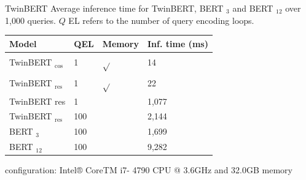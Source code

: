 \documentclass{beamer}
\begin{document}
\begin{frame}{TwinBERT}
        Average inference time for TwinBERT, BERT $_{3}$ and BERT $_{12}$ over 1,000 queries. $Q$ EL refers to the number of query encoding loops.

    \begin{center}

\begin{tabular}{llll}
\hline Model & QEL & Memory & Inf. time (ms) \\
\hline TwinBERT $_{\cos }$ & 1 & $\sqrt{ }$ & 14 \\
TwinBERT $_{\text {res }}$ & 1 & $\sqrt{ }$ & 22 \\
TwinBERT res & 1 & & 1,077 \\
TwinBERT $_{\text {res }}$ & 100 & & 2,144 \\
BERT $_{3}$ & 100 & & 1,699 \\
BERT $_{12}$ & 100 & & 9,282 \\
\hline
\end{tabular}


 configuration: Intel® CoreTM i7- 4790 CPU @ 3.6GHz and 32.0GB memory
    \end{center}
\end{frame}
\end{document}
